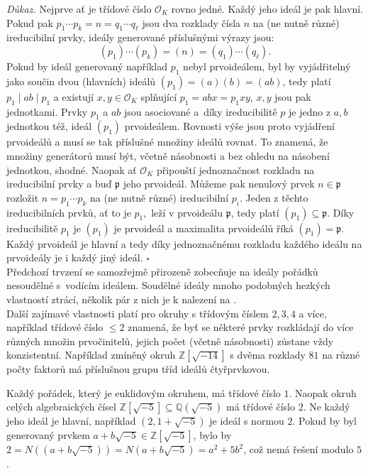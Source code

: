 \documentclass [12pt]{report}
\begin{document}
\noindent \textit{Důkaz.} Nejprve ať je třídové číslo $\mathcal{O}_K$ rovno jedné. Každý jeho ideál je pak hlavní. Pokud pak $p_1 \cdots p_k = n = q_1 \cdots q_{\ell}$ jsou dva rozklady čísla $n$ na (ne nutně různé) ireducibilní prvky, ideály generované příslušnými výrazy jsou:
\begin{equation*}
(p_1) \cdots (p_k) = (n) = (q_1) \cdots (q_\ell).
\end{equation*}
Pokud by ideál generovaný například $p_1$ nebyl prvoideálem, byl by vyjádřitelný jako součin dvou (hlavních) ideálů $(p_1) = (a)(b) = (ab)$, tedy platí $p_1 \mid ab \mid p_1$ a existují $x,y \in \mathcal{O}_K$ splňující $p_1 = abx = p_1 xy$, $x,y$ jsou pak jednotkami. Prvky $p_1$ a $ab$ jsou asociované a~díky ireducibilitě $p$ je jedno z $a,b$ jednotkou též, ideál $(p_1)$ prvoideálem. Rovnosti výše jsou proto vyjádření prvoideálů a musí se tak příslušné množiny ideálů rovnat. To znamená, že množiny generátorů musí být, včetně násobnosti a bez ohledu na násobení jednotkou, shodné. Naopak ať $\mathcal{O}_K$ připouští jednoznačnost rozkladu na ireducibilní prvky a buď $\mathfrak{p}$ jeho prvoideál. Můžeme pak nenulový prvek $n \in \mathfrak{p}$ rozložit $n = p_1 \cdots p_k$  na (ne nutně různé) ireducibilní $p_i$. Jeden z těchto ireducibilních prvků, ať to je $p_1,$ leží v prvoideálu $\mathfrak{p}$, tedy platí $(p_1) \subseteq \mathfrak{p}$. Díky ireducibilitě $p_1$ je $(p_1)$ je prvoideál a maximalita prvoideálů říká $(p_1) = \mathfrak{p}$. Každý prvoideál je hlavní a tedy díky jednoznačnému rozkladu každého ideálu na prvoideály je i každý jiný ideál. \hfill $\square$\\

Předchozí trvzení se samozřejmě přirozeně zobecňuje na ideály pořádků nesoudělné s~vodícím ideálem. Soudělné ideály mnoho podobných hezkých vlastností ztrácí, několik pár z nich je k nalezení na \cite[Ch. 3.]{Conrad3}.\\

Další zajímavé vlastnosti platí pro okruhy s třídovým číslem $2,3,4$ a více, například třídové číslo $\leqslant 2$ znamená, že byť se některé prvky rozkládají do více různých množin prvočinitelů, jejich počet (včetně násobnosti) zůstane vždy konzistentní. Například zmíněný okruh $\mathbb{Z}[\sqrt{-14}]$ s dvěma rozklady $81$ na různé počty faktorů má příslušnou grupu tříd ideálů čtyřprvkovou.\\

\begin{priklad}
Každý pořádek, který je euklidovým okruhem, má třídové číslo $1$. Naopak okruh celých algebraických čísel $\mathbb{Z}[\sqrt{-5}] \subseteq \mathbb{Q}(\sqrt{-5})$ má třídové číslo $2$. Ne každý jeho ideál je hlavní, například $(2,1+\sqrt{-5})$ je ideál s normou $2$. Pokud by byl generovaný prvkem $a+b\sqrt{-5} \in \mathbb{Z}[\sqrt{-5}]$, bylo by $2 = N((a+b\sqrt{-5})) = N(a+b\sqrt{-5}) = a^2+5b^2$, což nemá řešení modulo $5$.
\end{priklad}
 
\end{document}
